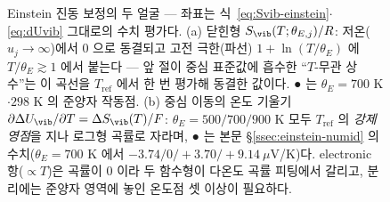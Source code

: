 \begin{figure}[t]
\caption{Einstein 진동 보정의 두 얼굴 --- 좌표는 식~\eqref{eq:Svib-einstein}$\cdot$\eqref{eq:dUvib}
그대로의 수치 평가다. (a) 닫힌형 $S_\vib(T;\theta_{E,j})/R$: 저온($u_j\to\infty$)에서 $0$ 으로
동결되고 고전 극한(파선) $1+\ln(T/\theta_E)$ 에 $T/\theta_E\gtrsim1$ 에서 붙는다 --- 앞 절이 중심
표준값에 흡수한 ``$T$-무관 상수''는 이 곡선을 $T_\mathrm{ref}$ 에서 한 번 평가해 동결한 값이다.
● 는 $\theta_E{=}700$ K$\cdot$$298$ K 의 준양자 작동점. (b) 중심 이동의 온도 기울기
$\partial\Delta U_\vib/\partial T=\Delta S_\vib(T)/F$: $\theta_{E}{=}500/700/900$ K 모두
$T_\mathrm{ref}$ 의 \emph{강제 영점}을 지나 로그형 곡률로 자라며, ● 는 본문 \S\ref{ssec:einstein-numid}
의 수치($\theta_E{=}700$ K 에서 $-3.74/0/+3.70/+9.14\ \mu$V/K)다. electronic 항($\propto T$)은 곡률이 $0$
이라 두 함수형이 다온도 곡률 피팅에서 갈리고, 분리에는 준양자 영역에 놓인 온도점 셋 이상이 필요하다.}
\label{fig:svibid}
\end{figure}


